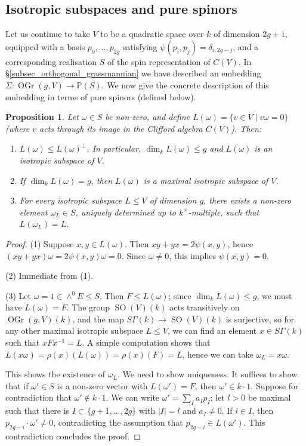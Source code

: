 \documentclass{article} %
\newtheorem{proposition}{Proposition}[section]
\numberwithin{equation}{section}
\DeclareMathOperator{\SO}{SO}
\renewcommand{\P}{\mathbb{P}}
\DeclareMathOperator{\OGr}{OGr}
\begin{document}
\subsection{Isotropic subspaces and pure spinors}\label{subsec_properties_of_pure_spinors}

Let us continue to take $V$ to be a quadratic space over $k$ of dimension $2g+1$, equipped with a basis $p_0, \dots, p_{2g}$ satisfying $\psi(p_i, p_j) = \delta_{i, 2g-j}$, and a corresponding realisation $S$ of the spin representation of $C(V)$. In \S \ref{subsec_orthogonal_grassmannian} we have described an embedding $\Sigma : \OGr(g, V) \to \P(S)$. We now give the concrete description of this embedding in terms of pure spinors (defined below). 
\begin{proposition}\label{prop_which_spinors_are_pure}
    Let $\omega \in S$ be non-zero, and define $L(\omega) = \{ v \in V \mid v \omega = 0 \}$ (where $v$ acts through its image in the Clifford algebra $C(V)$). Then:
    \begin{enumerate}
        \item $L(\omega) \leq L(\omega)^\perp$. In particular, $\dim_k L(\omega) \leq g$ and $L(\omega)$ is an isotropic subspace of $V$.
        \item If $\dim_k L(\omega) = g$, then $L(\omega)$ is a maximal isotropic subspace of $V$.
        \item For every isotropic subspace $L \leq V$ of dimension $g$, there exists a non-zero element $\omega_L \in S$, uniquely determined up to $k^\times$-multiple, such that $L(\omega_L) = L$. 
    \end{enumerate}
\end{proposition}
\begin{proof}
    (1) Suppose $x, y \in L(\omega)$. Then $x y + y x = 2 \psi(x, y)$, hence $(xy  + yx) \omega = 2 \psi(x, y) \omega = 0$. Since $\omega \neq 0$, this implies $\psi(x, y) = 0$.

    (2) Immediate from (1).

    (3) Let $\omega = 1 \in \wedge^0 E \leq S$. Then $F \leq L(\omega)$; since $\dim_k L(\omega) \leq g$, we must have $L(\omega) = F$. The group $\SO(V)(k)$ acts transitively on $\OGr(g, V)(k)$, and the map $S \Gamma(k) \to \SO(V)(k)$ is surjective, so for any other maximal isotropic subspace $L \leq V$, we can find an element $x \in S \Gamma(k)$ such that $x F x^{-1} = L$. A simple computation shows that $L(x \omega) = \rho(x)( L(\omega) ) = \rho(x)(F) = L$, hence we can take $\omega_L = x \omega$. 

    This shows the existence of $\omega_L$. We need to show uniqueness. It suffices to show that if $\omega' \in S$ is a non-zero vector with $L(\omega') = F$, then $\omega' \in k \cdot 1$. Suppose for contradiction that $\omega' \not\in k \cdot 1$. We can write $\omega' = \sum_I a_I p_I$; let $l > 0$ be maximal such that there is $I \subset \{ g+1, \dots, 2g \}$ with $|I| = l$ and $a_I \neq 0$. If $i \in I$, then $p_{2g-i} \cdot \omega' \neq 0$, contradicting the assumption that $p_{2g-i} \in L(\omega')$. This contradiction concludes the proof. 
\end{proof}
\end{document}

